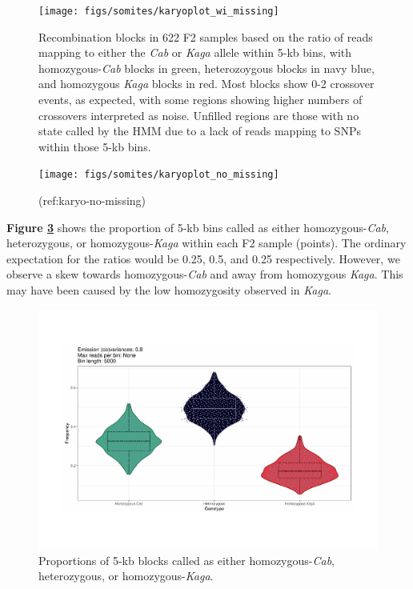 \documentclass[
]{book}
\begin{document}
\begin{figure}
\texttt{[image: figs/somites/karyoplot\_wi\_missing]} \caption{Recombination blocks in 622 F2 samples based on the ratio of reads mapping to either the \emph{Cab} or \emph{Kaga} allele within 5-kb bins, with homozygous-\emph{Cab} blocks in green, heterozoygous blocks in navy blue, and homozygous \emph{Kaga} blocks in red. Most blocks show 0-2 crossover events, as expected, with some regions showing higher numbers of crossovers interpreted as noise. Unfilled regions are those with no state called by the HMM due to a lack of reads mapping to SNPs within those 5-kb bins.}\label{fig:karyo-wi-missing}
\end{figure}

\begin{figure}
\texttt{[image: figs/somites/karyoplot\_no\_missing]} \caption{(ref:karyo-no-missing)}\label{fig:karyo-no-missing}
\end{figure}

\textbf{Figure \ref{fig:prop-sites-total}} shows the proportion of 5-kb bins called as either homozygous-\emph{Cab}, heterozygous, or homozygous-\emph{Kaga} within each F2 sample (points). The ordinary expectation for the ratios would be 0.25, 0.5, and 0.25 respectively. However, we observe a skew towards homozygous-\emph{Cab} and away from homozygous \emph{Kaga}. This may have been caused by the low homozygosity observed in \emph{Kaga}.



\begin{figure}
\includegraphics[width=1\linewidth]{figs/somites/prop_sites_total} \caption{Proportions of 5-kb blocks called as either homozygous-\emph{Cab}, heterozygous, or homozygous-\emph{Kaga}.}\label{fig:prop-sites-total}
\end{figure}
\end{document}
